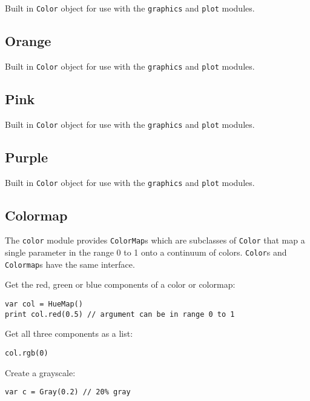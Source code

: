 Built in \texttt{Color} object for use with the \texttt{graphics} and
\texttt{plot} modules.

\hypertarget{orange}{%
\subsection{Orange}\label{orange}}

Built in \texttt{Color} object for use with the \texttt{graphics} and
\texttt{plot} modules.

\hypertarget{pink}{%
\subsection{Pink}\label{pink}}

Built in \texttt{Color} object for use with the \texttt{graphics} and
\texttt{plot} modules.

\hypertarget{purple}{%
\subsection{Purple}\label{purple}}

Built in \texttt{Color} object for use with the \texttt{graphics} and
\texttt{plot} modules.

\hypertarget{colormap}{%
\subsection{Colormap}\label{colormap}}

The \texttt{color} module provides \texttt{ColorMap}s which are
subclasses of \texttt{Color} that map a single parameter in the range 0
to 1 onto a continuum of colors. \texttt{Color}s and \texttt{Colormap}s
have the same interface.

Get the red, green or blue components of a color or colormap:

\begin{lstlisting}
var col = HueMap()
print col.red(0.5) // argument can be in range 0 to 1
\end{lstlisting}

Get all three components as a list:

\begin{lstlisting}
col.rgb(0)
\end{lstlisting}

Create a grayscale:

\begin{lstlisting}
var c = Gray(0.2) // 20% gray
\end{lstlisting}

